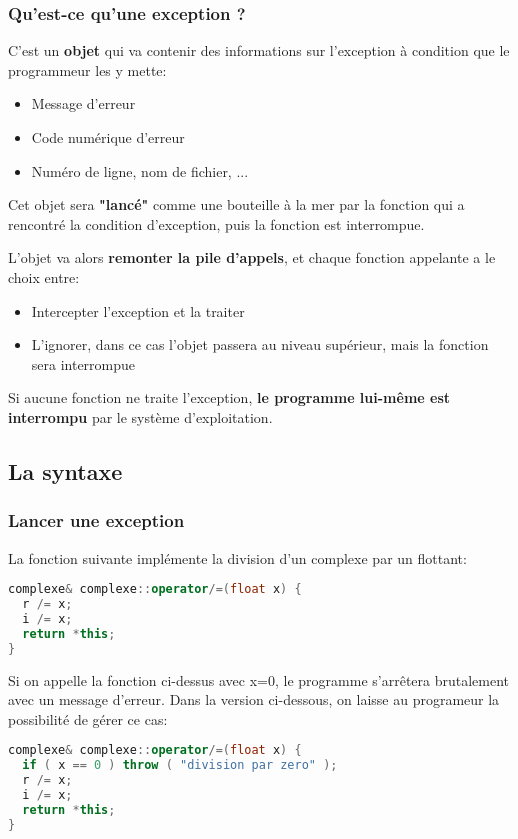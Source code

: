 \documentclass{beamer}
\begin{document}
\begin{frame}[fragile=singleslide,shrink=20]
\frametitle {Qu'est-ce qu'une exception ?}

C'est un \textbf{objet} qui va contenir des informations sur l'exception à condition que le programmeur les y mette:
\begin{itemize}
\item{Message d'erreur}
\item{Code numérique d'erreur}
\item{Numéro de ligne, nom de fichier, ...}
\end{itemize}

Cet objet sera \textbf{"lancé"} comme une bouteille à la mer par la fonction qui a rencontré la condition d'exception, puis la fonction est interrompue.

L'objet va alors \textbf{remonter la pile d'appels}, et chaque fonction appelante a le choix entre:

\begin{itemize}
\item{Intercepter l'exception et la traiter}
\item{L'ignorer, dans ce cas l'objet passera au niveau supérieur, mais la fonction sera interrompue}
\end{itemize}

Si aucune fonction ne traite l'exception, \textbf{le programme lui-même est interrompu} par le système d'exploitation.

\end{frame}

\subsection{La syntaxe}

\begin{frame}[fragile=singleslide,shrink=20]
\frametitle {Lancer une exception}

La fonction suivante implémente la division d'un complexe par un flottant:
\begin{lstlisting}[language=c++]
complexe& complexe::operator/=(float x) {
  r /= x;
  i /= x;
  return *this;
}
\end{lstlisting}

Si on appelle la fonction ci-dessus avec x=0, le programme s'arrêtera brutalement avec un message d'erreur.
Dans la version ci-dessous, on laisse au programeur la possibilité de gérer ce cas:
\begin{lstlisting}[language=c++]
complexe& complexe::operator/=(float x) {
  if ( x == 0 ) throw ( "division par zero" );  
  r /= x;
  i /= x;
  return *this;
}
\end{lstlisting}
\end{frame}
\end{document}
